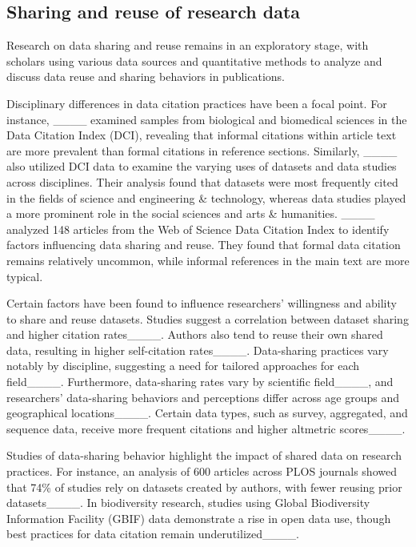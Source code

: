 \subsection{Sharing and reuse of research data}
Research on data sharing and reuse remains in an exploratory stage, with scholars using various data sources and quantitative methods to analyze and discuss data reuse and sharing behaviors in publications.

Disciplinary differences in data citation practices have been a focal point. For instance, ____ examined samples from biological and biomedical sciences in the Data Citation Index (DCI), revealing that informal citations within article text are more prevalent than formal citations in reference sections. Similarly, ____ also utilized DCI data to examine the varying uses of datasets and data studies across disciplines. Their analysis found that datasets were most frequently cited in the fields of science and engineering \& technology, whereas data studies played a more prominent role in the social sciences and arts \& humanities. ____ analyzed 148 articles from the Web of Science Data Citation Index to identify factors influencing data sharing and reuse. They found that formal data citation remains relatively uncommon, while informal references in the main text are more typical.

Certain factors have been found to influence researchers' willingness and ability to share and reuse datasets. Studies suggest a correlation between dataset sharing and higher citation rates____. Authors also tend to reuse their own shared data, resulting in higher self-citation rates____. Data-sharing practices vary notably by discipline, suggesting a need for tailored approaches for each field____. Furthermore, data-sharing rates vary by scientific field____, and researchers’ data-sharing behaviors and perceptions differ across age groups and geographical locations____. Certain data types, such as survey, aggregated, and sequence data, receive more frequent citations and higher altmetric scores____.

Studies of data-sharing behavior highlight the impact of shared data on research practices. For instance, an analysis of 600 articles across PLOS journals showed that 74\% of studies rely on datasets created by authors, with fewer reusing prior datasets____. In biodiversity research, studies using Global Biodiversity Information Facility (GBIF) data demonstrate a rise in open data use, though best practices for data citation remain underutilized____.

